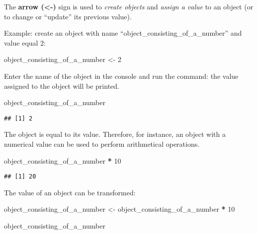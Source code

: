 \documentclass[
]{article}
\newenvironment{Shaded}{\begin{snugshade}}{\end{snugshade}}
\newcommand{\DecValTok}[1]{\textcolor[rgb]{0.00,0.00,0.81}{#1}}
\newcommand{\NormalTok}[1]{#1}
\newcommand{\OtherTok}[1]{\textcolor[rgb]{0.56,0.35,0.01}{#1}}
\newcommand{\SpecialCharTok}[1]{\textcolor[rgb]{0.81,0.36,0.00}{\textbf{#1}}}
\begin{document}
The \textbf{arrow (\textless-)} sign is used to \emph{create objects} and \emph{assign a value} to an object (or to change or ``update'' its previous value).

Example: create an object with name ``object\_consisting\_of\_a\_number'' and value equal 2:

\begin{Shaded}
\begin{Highlighting}[]
\NormalTok{object\_consisting\_of\_a\_number }\OtherTok{\textless{}{-}} \DecValTok{2}
\end{Highlighting}
\end{Shaded}

Enter the name of the object in the console and run the command: the value assigned to the object will be printed.

\begin{Shaded}
\begin{Highlighting}[]
\NormalTok{object\_consisting\_of\_a\_number}
\end{Highlighting}
\end{Shaded}

\begin{verbatim}
## [1] 2
\end{verbatim}

The object is equal to its value. Therefore, for instance, an object with a numerical value can be used to perform arithmetical operations.

\begin{Shaded}
\begin{Highlighting}[]
\NormalTok{object\_consisting\_of\_a\_number }\SpecialCharTok{*} \DecValTok{10}
\end{Highlighting}
\end{Shaded}

\begin{verbatim}
## [1] 20
\end{verbatim}

The value of an object can be transformed:

\begin{Shaded}
\begin{Highlighting}[]
\NormalTok{object\_consisting\_of\_a\_number }\OtherTok{\textless{}{-}}\NormalTok{ object\_consisting\_of\_a\_number }\SpecialCharTok{*} \DecValTok{10}

\NormalTok{object\_consisting\_of\_a\_number}
\end{Highlighting}
\end{Shaded}
\end{document}
